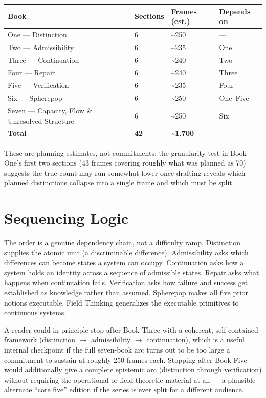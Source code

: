 \documentclass[11pt]{article}
\begin{document}
\begin{longtable}{@{}p{4.2cm}p{1.6cm}p{1.6cm}p{6.8cm}@{}}
\toprule
\textbf{Book} & \textbf{Sections} & \textbf{Frames (est.)} & \textbf{Depends on} \\
\midrule
\endhead
One --- Distinction & 6 & \textasciitilde250 & --- \\
Two --- Admissibility & 6 & \textasciitilde235 & One \\
Three --- Continuation & 6 & \textasciitilde240 & Two \\
Four --- Repair & 6 & \textasciitilde240 & Three \\
Five --- Verification & 6 & \textasciitilde235 & Four \\
Six --- Spherepop & 6 & \textasciitilde250 & One--Five \\
Seven --- Capacity, Flow \& Unresolved Structure & 6 & \textasciitilde250 & Six \\
\midrule
\textbf{Total} & \textbf{42} & \textbf{\textasciitilde1{,}700} & \\
\bottomrule
\end{longtable}

These are planning estimates, not commitments; the granularity test in Book One's first two sections (43 frames covering roughly what was planned as 70) suggests the true count may run somewhat lower once drafting reveals which planned distinctions collapse into a single frame and which must be split.

\section*{Sequencing Logic}

The order is a genuine dependency chain, not a difficulty ramp. Distinction supplies the atomic unit (a discriminable difference). Admissibility asks which differences can become states a system can occupy. Continuation asks how a system holds an identity across a sequence of admissible states. Repair asks what happens when continuation fails. Verification asks how failure and success get established as knowledge rather than assumed. Spherepop makes all five prior notions executable. Field Thinking generalizes the executable primitives to continuous systems.

A reader could in principle stop after Book Three with a coherent, self-contained framework (distinction $\rightarrow$ admissibility $\rightarrow$ continuation), which is a useful internal checkpoint if the full seven-book arc turns out to be too large a commitment to sustain at roughly 250 frames each. Stopping after Book Five would additionally give a complete epistemic arc (distinction through verification) without requiring the operational or field-theoretic material at all --- a plausible alternate ``core five'' edition if the series is ever split for a different audience.
\end{document}
